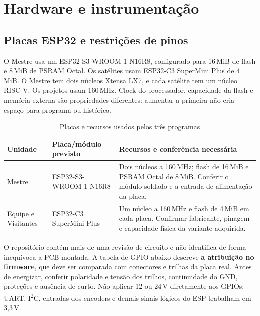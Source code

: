 \chapter{Hardware e instrumentação}\label{cap:hardware}
\section{Placas ESP32 e restrições de pinos}
O Mestre usa um ESP32-S3-WROOM-1-N16R8, configurado para 16\,MiB de flash e 8\,MiB de PSRAM Octal. Os satélites usam ESP32-C3 SuperMini Plus de 4\,MiB. O Mestre tem dois núcleos Xtensa LX7, e cada satélite tem um núcleo RISC-V. Os projetos usam 160\,MHz. Clock do processador, capacidade da flash e memória externa são propriedades diferentes: aumentar a primeira não cria espaço para programa ou histórico.

\begin{table}[htbp]\centering\small
\caption{Placas e recursos usados pelos três programas}\label{tab:modelos-esp}
\begin{tabularx}{\textwidth}{@{}p{2.5cm}p{4.2cm}X@{}}\toprule
Unidade & Placa/módulo previsto & Recursos e conferência necessária\\\midrule
Mestre & ESP32-S3-WROOM-1-N16R8 & Dois núcleos a 160\,MHz; flash de 16\,MiB e PSRAM Octal de 8\,MiB. Conferir o módulo soldado e a entrada de alimentação da placa.\\
Equipe e Visitantes & ESP32-C3 SuperMini Plus & Um núcleo a 160\,MHz e flash de 4\,MiB em cada placa. Confirmar fabricante, pinagem e capacidade física da variante adquirida.\\\bottomrule
\end{tabularx}\end{table}

O repositório contém mais de uma revisão de circuito e não identifica de forma inequívoca a PCB montada. A tabela de GPIO abaixo descreve \textbf{a atribuição no firmware}, que deve ser comparada com conectores e trilhas da placa real. Antes de energizar, conferir polaridade e tensão dos trilhos, continuidade do GND, proteções e ausência de curto. Não aplicar 12 ou 24\,V diretamente aos GPIOs: UART, I\textsuperscript{2}C, entradas dos encoders e demais sinais lógicos do ESP trabalham em 3,3\,V.


